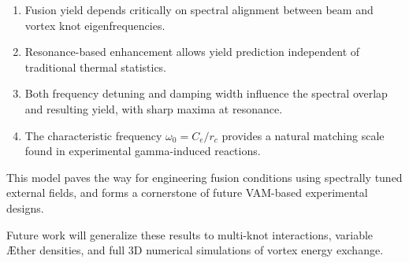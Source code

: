 \begin{enumerate}
  \item Fusion yield depends critically on spectral alignment between beam and vortex knot eigenfrequencies.
  \item Resonance-based enhancement allows yield prediction independent of traditional thermal statistics.
  \item Both frequency detuning and damping width influence the spectral overlap and resulting yield, with sharp maxima at resonance.
  \item The characteristic frequency \( \omega_0 = C_e / r_c \) provides a natural matching scale found in experimental gamma-induced reactions.
\end{enumerate}

This model paves the way for engineering fusion conditions using spectrally tuned external fields, and forms a cornerstone of future VAM-based experimental designs.

Future work will generalize these results to multi-knot interactions, variable Æther densities, and full 3D numerical simulations of vortex energy exchange.